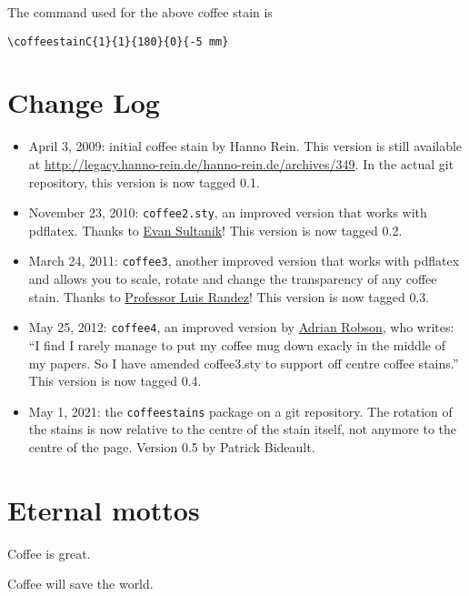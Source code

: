 \documentclass[a4paper, 11pt, BCOR = 0 pt, oneside, english]{scrartcl}
\begin{document}
\vfill{}

\begin{tcolorbox}
  The command used for the above coffee stain is

  \verb|\coffeestainC{1}{1}{180}{0}{-5 mm}|
\end{tcolorbox}
\newpage{}
\section{Change Log}
\begin{itemize}
\item April 3, 2009: initial coffee stain by Hanno Rein. This version is still
  available at \url{http://legacy.hanno-rein.de/hanno-rein.de/archives/349}. In the actual git repository, this version is now tagged 0.1.
\item November 23, 2010: \texttt{coffee2.sty}, an improved version that works
  with pdflatex. Thanks to \href{http://www.sultanik.com/}{Evan Sultanik}! This
  version is now tagged 0.2.
\item March 24, 2011: \texttt{coffee3}, another improved version that works with
  pdflatex and allows you to scale, rotate and change the transparency of any
  coffee stain. Thanks to \href{http://pcmap.unizar.es/~pilar/}{Professor Luis
    Randez}! This version is now tagged 0.3.
\item May 25, 2012: \texttt{coffee4}, an improved version by
  \href{http://nepsweb.co.uk/homeapr/}{Adrian Robson}, who writes: “I find
  I rarely manage to put my coffee mug down exacly in the middle of my papers.
  So I have amended coffee3.sty to support off centre coffee stains.” This
  version is now tagged 0.4.
\item May 1, 2021: the \texttt{coffeestains} package on a git repository. The
  rotation of the stains is now relative to the centre of the stain itself, not
  anymore to the centre of the page. Version 0.5 by Patrick Bideault.
\end{itemize}

\label{stainB}

\section{Eternal mottos}

Coffee is great.

\vspace{5mm}

\noindent
Coffee will save the world.
\end{document}
